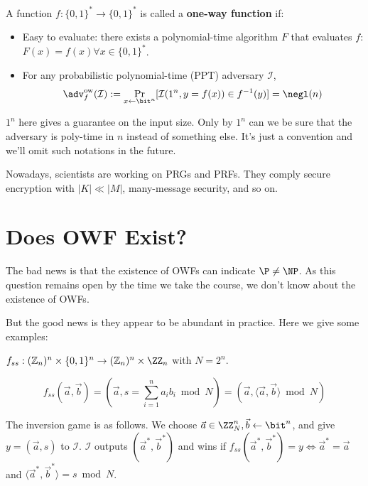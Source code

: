 \begin{definition}
	A function $f: \{0,1\}^* \to \{0,1\}^*$ is called a \textbf{one-way function} if:
	\begin{itemize}
		\item Easy to evaluate: there exists a polynomial-time algorithm $F$ that evaluates $f$: $F(x) = f(x) \forall x\in \{0,1\}^*$.
		\item For any probabilistic polynomial-time (PPT) adversary $\mathcal I$,
		      \[
			      \adv_f^{\text{ow}}(\mathcal I) := \Pr_{x\gets\bit^n}[\mathcal I(1^n, y = f(x))\in f^{-1}(y)] = \negl(n)
		      \]

	\end{itemize}
\end{definition}
\begin{remark}
	$1^n$ here gives a guarantee on the input size. Only by $1^n$ can we be sure that the adversary is poly-time in $n$ instead of something else. It's just a convention and we'll omit such notations in the future.
\end{remark}

Nowadays, scientists are working on PRGs and PRFs. They comply secure encryption with $|K| \ll |M|$, many-message security, and so on.

\section{Does OWF Exist?}

The bad news is that the existence of OWFs can indicate $\P \neq \NP$. As this question remains open by the time we take the course, we don't know about the existence of OWFs.

But the good news is they appear to be abundant in practice. Here we give some examples:

\begin{eg}
	$f_{ss}: (\mathbb Z_n)^n\times \{0,1\}^n \to (\mathbb Z_n)^n\times \ZZ_n$ with $N = 2^n$.

	\[ f_{ss}(\vec{a}, \vec{b}) = (\vec{a}, s=\sum_{i=1}^n a_i b_i \bmod N) = (\vec{a}, \langle \vec{a}, \vec{b} \rangle \bmod N) \]

	The inversion game is as follows. We choose $\vec{a}\in \ZZ_N^n, \vec{b}\gets \bit^n$, and give $y = (\vec{a}, s)$ to $\mathcal I$.
	$\mathcal I$ outputs $(\vec{a}^*, \vec{b}^*)$ and wins if $f_{ss}(\vec{a}^*,\vec{b}^*) = y \iff \vec{a}^* = \vec{a}$ and $\langle \vec{a}^*, \vec{b}^* \rangle = s\bmod N$.
\end{eg}
